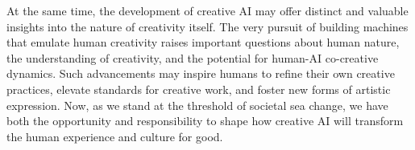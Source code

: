 \documentclass[phd,electronic,oneside,twosidetoc,letterpaper,chaptercenter,parttop,lof]{byumsphd}
\begin{document}
At the same time, the development of creative AI may offer distinct and valuable insights into the nature of creativity itself.
The very pursuit of building machines that emulate human creativity raises important questions about human nature, the understanding of creativity, and the potential for human-AI co-creative dynamics. 
Such advancements may inspire humans to refine their own creative practices, elevate standards for creative work, and foster new forms of artistic expression. 
Now, as we stand at the threshold of societal sea change, we have both the opportunity and responsibility to shape how creative AI will transform the human experience and culture for good.





\end{document}
